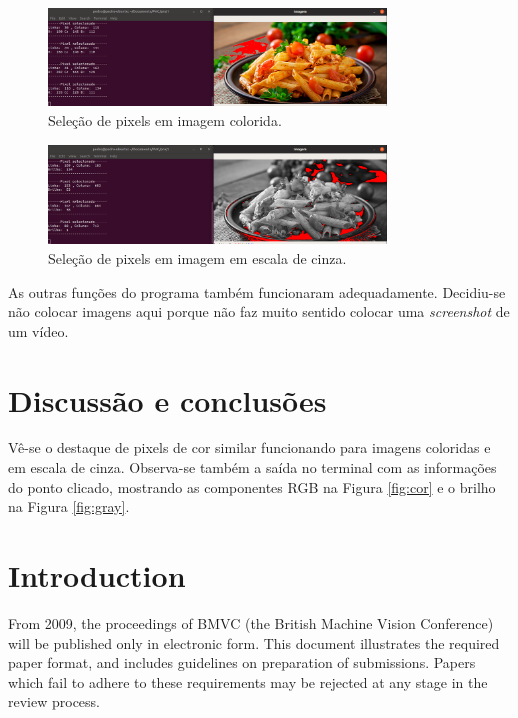 \documentclass{bmvc2k}
\begin{document}
\begin{figure}[htpb]
\begin{center}
\includegraphics[width=0.8\textwidth]{Figs/img2.png}
\end{center}
   \caption{Seleção de pixels em imagem colorida.}
   \label{fig:cor}
\label{fig:short}
\end{figure}

\begin{figure}[htpb]
\begin{center}
\includegraphics[width=0.8\textwidth]{Figs/img1.png}
\end{center}
   \caption{Seleção de pixels em imagem em escala de cinza.}
   \label{fig:gray}
\label{fig:short}
\end{figure}

As outras funções do programa também funcionaram adequadamente. Decidiu-se não colocar imagens aqui porque não faz muito sentido colocar uma \textit{screenshot} de um vídeo. 

\section{Discussão e conclusões}
\label{sec:concl}

Vê-se o destaque de pixels de cor similar funcionando para imagens coloridas e em escala de cinza. Observa-se também a saída no terminal com as informações do ponto clicado, mostrando as componentes RGB na Figura \ref{fig:cor} e o brilho na Figura \ref{fig:gray}.











\iffalse
\section{Introduction}
\label{sec:intro}
From 2009, the proceedings of BMVC (the British Machine Vision
Conference) will be published only in electronic form.  This document
illustrates the required paper format, and includes guidelines on
preparation of submissions.  Papers which fail to adhere to these
requirements may be rejected at any stage in the review process.
\end{document}
